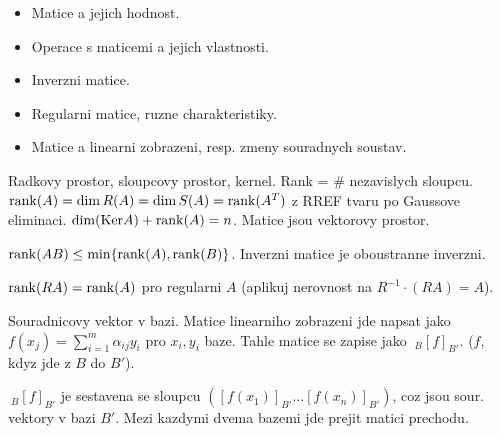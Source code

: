 \begin{itemize}
\item Matice a jejich hodnost.
\item Operace s maticemi a jejich vlastnosti.
\item Inverzni matice.
\item Regularni matice, ruzne charakteristiky.
\item Matice a linearni zobrazeni, resp. zmeny souradnych soustav.
\end{itemize}

Radkovy prostor, sloupcovy prostor, kernel. Rank = \# nezavislych sloupcu.
$\mathrm{rank}(A)=\dim R(A)=\dim S(A)=\mathrm{rank}(A^T)$ z RREF tvaru po Gaussove eliminaci.
$\dim(\mathrm{Ker} A)+\mathrm{rank}(A)=n$. Matice jsou vektorovy prostor.

$\mathrm{rank}(AB)\leq\min\{\mathrm{rank}(A),\mathrm{rank}(B)\}$. Inverzni matice je oboustranne inverzni.

$\mathrm{rank}(RA)=\mathrm{rank}(A)$ pro regularni $A$ (aplikuj nerovnost na $R^{-1}\cdot(RA)=A$).

Souradnicovy vektor v bazi. Matice linearniho zobrazeni jde napsat jako
$f(x_j)=\sum_{i=1}^m \alpha_{ij}y_i$ pro $x_i,y_i$ baze. Tahle matice
se zapise jako $\ _{B}[f]_{B'}$. ($f$, kdyz jde z $B$ do $B'$).

$\ _{B}[f]_{B'}$ je sestavena se sloupcu $([f(x_1)]_{B'}\ldots [f(x_n)]_{B'})$,
coz jsou sour. vektory v bazi $B'$.
Mezi kazdymi dvema bazemi jde prejit matici prechodu.
